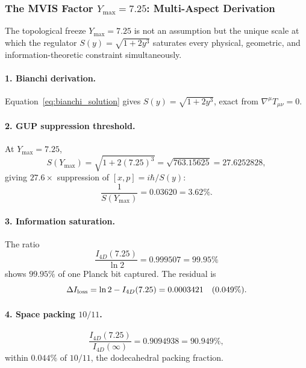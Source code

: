 \documentclass[12pt,oneside,openany]{book}
\begin{document}
\subsubsection{The MVIS Factor \(Y_{\max} = 7.25\): Multi-Aspect Derivation}
\label{sssec:mvis_derivation}

The topological freeze \(Y_{\max} = 7.25\) is not an assumption but the unique scale at which the regulator \(S(y) = \sqrt{1+2y^3}\) saturates every physical, geometric, and information-theoretic constraint simultaneously.

\paragraph{1. Bianchi derivation.} Equation~\eqref{eq:bianchi_solution} gives \(S(y) = \sqrt{1+2y^3}\), exact from \(\nabla^\mu T_{\mu\nu} = 0\).

\paragraph{2. GUP suppression threshold.} At \(Y_{\max} = 7.25\),
\begin{equation}
S(Y_{\max}) = \sqrt{1+2(7.25)^3} = \sqrt{763.15625} = 27.6252828,
\end{equation}
giving \(27.6\times\) suppression of \([x,p] = i\hbar/S(y)\):
\begin{equation}
\frac{1}{S(Y_{\max})} = 0.03620 = 3.62\%.
\end{equation}

\paragraph{3. Information saturation.} The ratio
\begin{equation}
\frac{I_{4D}(7.25)}{\ln 2} = 0.999507 = 99.95\%
\end{equation}
shows \(99.95\%\) of one Planck bit captured. The residual is
\begin{equation}
\Delta I_{\rm loss} = \ln 2 - I_{4D}(7.25) = 0.0003421 \quad (0.049\%).
\end{equation}

\paragraph{4. Space packing \(10/11\).}
\begin{equation}
\frac{I_{4D}(7.25)}{I_{4D}(\infty)} = 0.9094938 = 90.949\%,
\end{equation}
within \(0.044\%\) of \(10/11\), the dodecahedral packing fraction.
\end{document}
